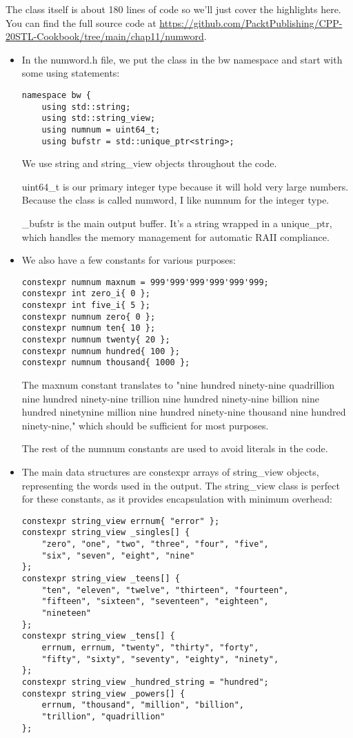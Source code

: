 The class itself is about 180 lines of code so we'll just cover the highlights here. You can find the full source code at \url{https://github.com/PacktPublishing/CPP-20STL-Cookbook/tree/main/chap11/numword}.

\begin{itemize}
\item 
In the numword.h file, we put the class in the bw namespace and start with some using statements:

\begin{lstlisting}[style=styleCXX]
namespace bw {
	using std::string;
	using std::string_view;
	using numnum = uint64_t;
	using bufstr = std::unique_ptr<string>;
\end{lstlisting}

We use string and string\_view objects throughout the code.

uint64\_t is our primary integer type because it will hold very large numbers. Because the class is called numword, I like numnum for the integer type.

\_bufstr is the main output buffer. It's a string wrapped in a unique\_ptr, which handles the memory management for automatic RAII compliance.

\item 
We also have a few constants for various purposes:

\begin{lstlisting}[style=styleCXX]
constexpr numnum maxnum = 999'999'999'999'999'999;
constexpr int zero_i{ 0 };
constexpr int five_i{ 5 };
constexpr numnum zero{ 0 };
constexpr numnum ten{ 10 };
constexpr numnum twenty{ 20 };
constexpr numnum hundred{ 100 };
constexpr numnum thousand{ 1000 };
\end{lstlisting}

The maxnum constant translates to "nine hundred ninety-nine quadrillion nine hundred ninety-nine trillion nine hundred ninety-nine billion nine hundred ninetynine million nine hundred ninety-nine thousand nine hundred ninety-nine," which should be sufficient for most purposes.

The rest of the numnum constants are used to avoid literals in the code.

\item 
The main data structures are constexpr arrays of string\_view objects, representing the words used in the output. The string\_view class is perfect for these constants, as it provides encapsulation with minimum overhead:

\begin{lstlisting}[style=styleCXX]
constexpr string_view errnum{ "error" };
constexpr string_view _singles[] {
	"zero", "one", "two", "three", "four", "five",
	"six", "seven", "eight", "nine"
};
constexpr string_view _teens[] {
	"ten", "eleven", "twelve", "thirteen", "fourteen",
	"fifteen", "sixteen", "seventeen", "eighteen",
	"nineteen"
};
constexpr string_view _tens[] {
	errnum, errnum, "twenty", "thirty", "forty",
	"fifty", "sixty", "seventy", "eighty", "ninety",
};
constexpr string_view _hundred_string = "hundred";
constexpr string_view _powers[] {
	errnum, "thousand", "million", "billion",
	"trillion", "quadrillion"
};
\end{lstlisting}


\end{itemize}
